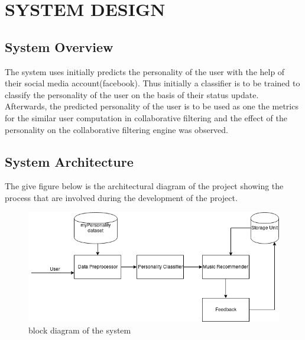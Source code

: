 \newpage
\section{SYSTEM DESIGN}

\subsection{System Overview}
The system uses initially predicts the personality of the user with the help of their social media account(facebook). Thus initially a classifier is to be trained to classify the personality of the user on the basis of their status update. Afterwards, the predicted personality of the user is to be used as one the metrics for the similar user computation in collaborative filtering and the effect of the personality on the collaborative filtering engine was observed.

\subsection{System Architecture}
The give figure below is the architectural diagram of the project showing the process that are involved during the development of the project.

\begin{figure}[!ht]
\centering
\includegraphics[width = 16 cm]{fig/system.png}
\caption{block diagram of the system}
\label{fig:project}
\end{figure}

